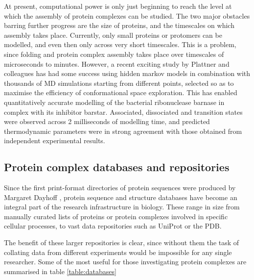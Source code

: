 \documentclass[a4paper,11pt,twoside,openright]{scrbook}
\begin{document}
At present, computational power is only just beginning to reach the level at which the assembly of protein complexes can be studied. The two major obstacles barring further progress are the size of proteins, and the timescales on which assembly takes place. Currently, only small proteins or protomers can be modelled, and even then only across very short timescales. This is a problem, since folding and protein complex assembly takes place over timescales of microseconds to minutes. However, a recent exciting study by Plattner and colleagues \cite{Plattner2017} has had some success using hidden markov models in combination with thousands of MD simulations starting from different points, selected so as to maximise the efficiency of conformational space exploration. This has enabled quantitatively accurate modelling of the bacterial ribonuclease barnase in complex with its inhibitor barstar. Associated, dissociated and transition states were observed across 2 milliseconds of modelling time, and predicted thermodynamic parameters were in strong agreement with those obtained from independent experimental results.

\subsection{Protein complex databases and repositories}
Since the first print-format directories of protein sequences were produced by Margaret Dayhoff \cite{Dayhoff1965}, protein sequence and structure databases have become an integral part of the research infrastructure in biology. These range in size from manually curated lists of proteins or protein complexes involved in specific cellular processes, to vast data repositories such as UniProt or the PDB.

The benefit of these larger repositories is clear, since without them the task of collating data from different experiments would be impossible for any single researcher. Some of the most useful for those investigating protein complexes are summarised in table \ref{table:databases}

\clearpage
\end{document}
